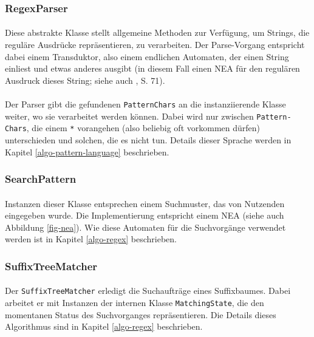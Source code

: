 \subsubsection{RegexParser}

\paragraph{} Diese abstrakte Klasse stellt allgemeine Methoden zur Verfügung, um Strings, die reguläre Ausdrücke repräsentieren, zu verarbeiten. Der Parse-Vorgang entspricht dabei einem Transduktor, also einem endlichen Automaten, der einen String einliest und etwas anderes ausgibt (in diesem Fall einen NEA für den regulären Ausdruck dieses String; siehe auch \cite{jurafsky&martin}, S. 71).
\paragraph{} Der Parser gibt die gefundenen \texttt{PatternChars} an die instanziierende Klasse weiter, wo sie verarbeitet werden können. Dabei wird nur zwischen \texttt{Pattern-\\Chars}, die einem \texttt{*} vorangehen (also beliebig oft vorkommen dürfen) unterschieden und solchen, die es nicht tun. Details dieser Sprache werden in Kapitel \ref{algo-pattern-language} beschrieben.

\subsubsection{SearchPattern}

\paragraph{} Instanzen dieser Klasse entsprechen einem Suchmuster, das von Nutzenden eingegeben wurde. Die Implementierung entspricht einem NEA (siehe auch Abbildung \ref{fig-nea}). Wie diese Automaten für die Suchvorgänge verwendet werden ist in Kapitel \ref{algo-regex} beschrieben.


\subsubsection{SuffixTreeMatcher}
\label{suffixTreeMatcher}

\paragraph{} Der \texttt{SuffixTreeMatcher} erledigt die Suchaufträge eines Suffixbaumes. Dabei arbeitet er mit Instanzen der internen Klasse \texttt{MatchingState}, die den momentanen Status des Suchvorganges repräsentieren. Die Details dieses Algorithmus sind in Kapitel \ref{algo-regex} beschrieben.

